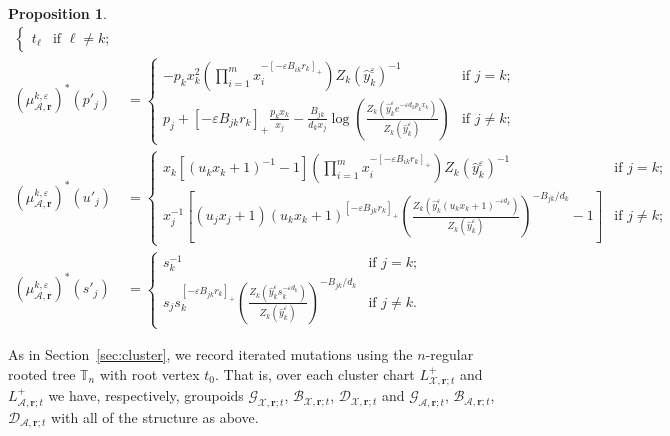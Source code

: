 \documentclass{amsart}
\newtheorem{proposition}[theorem]{Proposition}
\numberwithin{equation}{section}
\newcommand{\bfr}{{\boldsymbol{r}}}
\newcommand{\cA}{\mathcal{A}}
\newcommand{\cB}{\mathcal{B}}
\newcommand{\cD}{\mathcal{D}}
\newcommand{\cG}{\mathcal{G}}
\newcommand{\cX}{\mathcal{X}}
\newcommand{\TT}{\mathbb{T}}
\begin{document}
\begin{proposition}
\begin{align}
\begin{cases}
      t_\ell & \text{if $\ell\ne k$;}
    \end{cases}\\
    \label{eq:GA mutation}
    (\mu_{\cA,\bfr}^{k,\varepsilon})^*(p'_j)&=
    \begin{cases} 
      -p_k x_k^2 \left(\prod_{i=1}^m x_i^{-[-\varepsilon B_{ik} r_k]_+}\right) Z_k(\hat y_k^\varepsilon)^{-1} & \text{if $j=k$;}\\ 
      p_j + [-\varepsilon B_{jk} r_k]_+ \frac{p_k x_k}{x_j} - \frac{B_{jk}}{d_k x_j}\log\left(\frac{Z_k\left(\hat y_k^\varepsilon e^{-\varepsilon d_kp_kx_k}\right)}{Z_k(\hat y_k^\varepsilon)}\right) & \text{if $j\ne k$;}
    \end{cases}\\
    \label{eq:BA mutation}
    (\mu_{\cA,\bfr}^{k,\varepsilon})^*(u'_j)
    &=\begin{cases}
      x_k \left[ (u_k x_k +1)^{-1} -1\right] \left(\prod_{i=1}^m x_i^{-[-\varepsilon B_{ik} r_k]_+}\right) Z_k(\hat y_k^\varepsilon)^{-1} & \text{if $j=k$;}\\ 
      x_j^{-1} \left[ (u_j x_j + 1) (u_k x_k + 1)^{[-\varepsilon B_{jk} r_k]_+} \left(\frac{Z_k\left(\hat y_k^\varepsilon (u_k x_k +1)^{-\varepsilon d_k}\right)}{Z_k(\hat y_k^\varepsilon)}\right)^{-B_{jk}/d_k} - 1\right] & \text{if $j\ne k$;}
    \end{cases}\\
    \label{eq:DA mutation}
    (\mu_{\cA,\bfr}^{k,\varepsilon})^*(s'_j)
    &=\begin{cases} 
      s_k^{-1} & \text{if $j=k$;}\\ 
      s_j s_k^{[-\varepsilon B_{jk} r_k]_+} \left(\frac{Z_k\left(\hat y_k^\varepsilon s_k^{-\varepsilon d_k}\right)}{Z_k(\hat y_k^\varepsilon)}\right)^{-B_{jk}/d_k} & \text{if $j\ne k$.}
    \end{cases}
  \end{align}
\end{proposition}

As in Section~\ref{sec:cluster}, we record iterated mutations using the $n$-regular rooted tree $\TT_n$ with root vertex $t_0$.
That is, over each cluster chart $L^+_{\cX,\bfr;t}$ and $L^+_{\cA,\bfr;t}$ we have, respectively, groupoids $\cG_{\cX,\bfr;t}$, $\cB_{\cX,\bfr;t}$, $\cD_{\cX,\bfr;t}$ and $\cG_{\cA,\bfr;t}$, $\cB_{\cA,\bfr;t}$, $\cD_{\cA,\bfr;t}$ with all of the structure as above.
\end{document}
